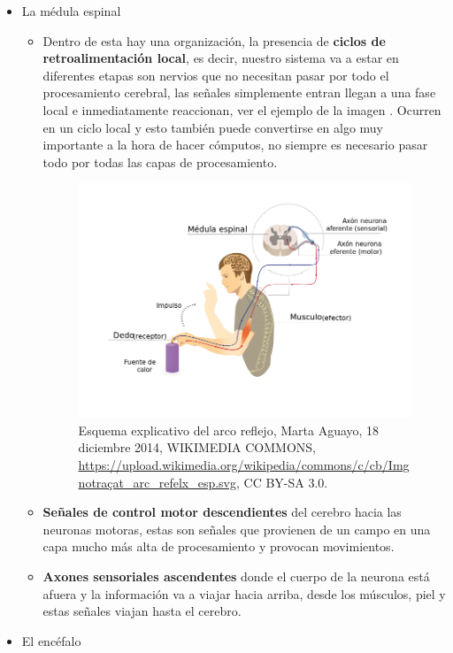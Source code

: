 \begin{itemize}
 \item La médula espinal
    \begin{itemize}
     \item Dentro de esta hay una organización, la presencia de \textbf{ciclos de retroalimentación local}, es decir, nuestro sistema va a estar en diferentes etapas son nervios que no necesitan pasar por todo el procesamiento cerebral, las señales simplemente entran llegan a una fase local e inmediatamente reaccionan, ver el ejemplo de la imagen . Ocurren en un ciclo local y esto también puede convertirse en algo muy importante a la hora de hacer cómputos, no siempre es necesario pasar todo por todas las capas de procesamiento. 


     \begin{figure}[h]
      \centering
      \includegraphics[scale=0.4]{../Figuras/actReflejo.png}
      \caption{ Esquema explicativo del arco reflejo, Marta Aguayo, 18 diciembre 2014, WIKIMEDIA COMMONS, \url{https://upload.wikimedia.org/wikipedia/commons/c/cb/Imgnotraçat_arc_refelx_esp.svg}, CC BY-SA 3.0.}
      \label{actReflejo}
     \end{figure}


     \item \textbf{Señales de control motor descendientes} del cerebro hacia las neuronas motoras, estas son señales que provienen de un campo en una capa mucho más alta de procesamiento y provocan movimientos.
     
     \item \textbf{Axones sensoriales ascendentes} donde el cuerpo de la neurona está afuera y la información va a viajar hacia arriba, desde los músculos, piel y  estas señales viajan hasta el cerebro.  


     \end{itemize}


 \item El encéfalo
\end{itemize}


